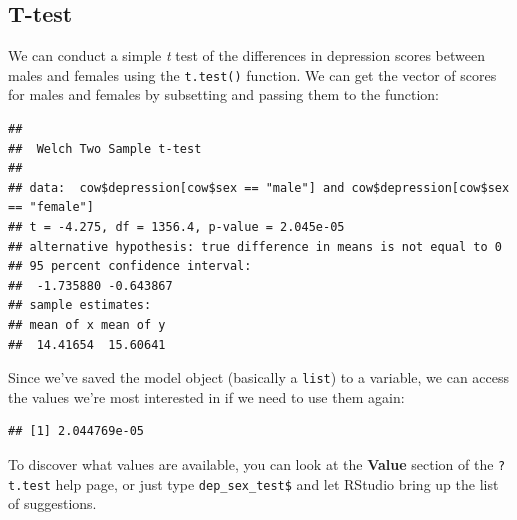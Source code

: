 \documentclass[
]{book}
\newenvironment{Shaded}{\begin{snugshade}}{\end{snugshade}}
\newcommand{\FunctionTok}[1]{\textcolor[rgb]{0.00,0.00,0.00}{#1}}
\newcommand{\NormalTok}[1]{#1}
\newcommand{\OtherTok}[1]{\textcolor[rgb]{0.56,0.35,0.01}{#1}}
\newcommand{\SpecialCharTok}[1]{\textcolor[rgb]{0.00,0.00,0.00}{#1}}
\newcommand{\StringTok}[1]{\textcolor[rgb]{0.31,0.60,0.02}{#1}}
\begin{document}
\hypertarget{t-test}{%
\subsection{T-test}\label{t-test}}

We can conduct a simple \emph{t} test of the differences in depression
scores between males and females using the \texttt{t.test()} function.
We can get the vector of scores for males and females by subsetting
and passing them to the function:

\begin{Shaded}
\end{Shaded}

\begin{verbatim}
## 
##  Welch Two Sample t-test
## 
## data:  cow$depression[cow$sex == "male"] and cow$depression[cow$sex == "female"]
## t = -4.275, df = 1356.4, p-value = 2.045e-05
## alternative hypothesis: true difference in means is not equal to 0
## 95 percent confidence interval:
##  -1.735880 -0.643867
## sample estimates:
## mean of x mean of y 
##  14.41654  15.60641
\end{verbatim}

Since we've saved the model object (basically a \texttt{list}) to a variable, we can
access the values we're most interested in if we need to use them again:

\begin{Shaded}
\end{Shaded}

\begin{verbatim}
## [1] 2.044769e-05
\end{verbatim}

To discover what values are available, you can look at the \textbf{Value}
section of the \texttt{?t.test} help page, or just type \texttt{dep\_sex\_test\$} and
let RStudio bring up the list of suggestions.
\end{document}
